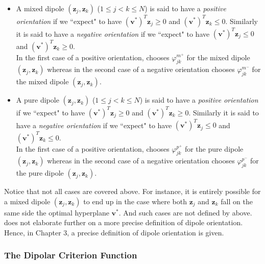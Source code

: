 \documentclass[12pt]{amsart}
\theoremstyle{definition}
\theoremstyle{plain}
\theoremstyle{remark}
\begin{document}
\begin{itemize}
	\item A mixed dipole $(\mathbf{z}_j, \mathbf{z}_k)$ ($1 \leq j < k \leq N$) is said to have a \emph{positive orientation} if we ``expect" \cite{kretowska} to have $(\mathbf{v}^\ast)^T \mathbf{z}_j \geq 0$ and $(\mathbf{v}^\ast)^T \mathbf{z}_k \leq 0$. Similarly it is said to have a \emph{negative orientation} if we ``expect" \cite{kretowska} to have $(\mathbf{v}^\ast)^T \mathbf{z}_j \leq 0$ and $(\mathbf{v}^\ast)^T \mathbf{z}_k \geq 0$. \\
	
	In the first case of a positive orientation, \cite{kretowska} chooses $\varphi^{m^+}_{jk}$ for the mixed dipole $(\mathbf{z}_j, \mathbf{z}_k)$ whereas in the second case of a negative orientation  \cite{kretowska} chooses $\varphi^{m^-}_{jk}$ for the mixed dipole $(\mathbf{z}_j, \mathbf{z}_k)$. \\
	
	\item A pure dipole $(\mathbf{z}_j, \mathbf{z}_k)$ ($1 \leq j < k \leq N$) is said to have a \emph{positive orientation} if we ``expect" \cite{kretowska} to have $(\mathbf{v}^\ast)^T \mathbf{z}_j \geq 0$ and $(\mathbf{v}^\ast)^T \mathbf{z}_k \geq 0$. Similarly it is said to have a \emph{negative orientation} if we ``expect" \cite{kretowska} to have $(\mathbf{v}^\ast)^T \mathbf{z}_j \leq 0$ and $(\mathbf{v}^\ast)^T \mathbf{z}_k \leq 0$. \\
	
	In the first case of a positive orientation, \cite{kretowska} chooses $\varphi^{p^+}_{jk}$ for the pure dipole $(\mathbf{z}_j, \mathbf{z}_k)$ whereas in the second case of a negative orientation  \cite{kretowska} chooses $\varphi^{p^-}_{jk}$ for the pure dipole $(\mathbf{z}_j, \mathbf{z}_k)$. \\
\end{itemize} Notice that not all cases are covered above. For instance, it is entirely possible for a mixed dipole $(\mathbf{z}_j, \mathbf{z}_k)$ to end up in the case where both $\mathbf{z}_j$ and $\mathbf{z}_k$ fall on the same side the optimal hyperplane $\mathbf{v}^\ast$. And such cases are not defined by \cite{kretowska} above. \cite{kretowska} does not elaborate further on a more precise definition of dipole orientation. Hence, in Chapter 3, a precise definition of dipole orientation is given.


\subsubsection{The Dipolar Criterion Function} \hfill \\
\end{document}
